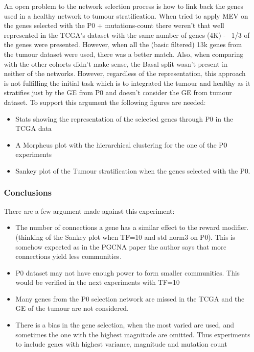 An open problem to the network selection process is how to link back the genes used in a healthy network to tumour stratification. When tried to apply MEV on the genes selected with the P0 + mutations-count there weren't that well represented in the TCGA's dataset with the same number of genes (4K) - ~1/3 of the genes were presented. However, when all the (basic filtered) 13k genes from the tumour dataset were used, there was a better match. Also, when comparing with the other cohorts didn't make sense, the Basal split wasn't present in neither of the networks. However, regardless of the representation, this approach is not fulfilling the initial task which is to integrated the tumour and healthy as it stratifies just by the GE from P0 and doesn't consider the GE from tumour dataset.
To support this argument the following figures are needed:
\begin{itemize}
    \item Stats showing the representation of the selected genes through P0 in the TCGA data
    \item A Morpheus plot with the hierarchical clustering for the one of the P0 experiments
    \item Sankey plot of the Tumour stratification when the genes selected with the P0.
\end{itemize}


\subsubsection{Conclusions}

There are a few argument made against this experiment:
\begin{itemize}
    \item The number of connections a gene has a similar effect to the reward modifier. (thinking of the Sankey plot when TF=10 and std-norm3 on P0). This is somehow expected as in the PGCNA paper the author says that more connections yield less communities.
    \item P0 dataset may not have enough power to form smaller communities. This would be verified in the next experiments with TF=10
    \item Many genes from the P0 selection network are missed in the TCGA and the GE of the tumour are not considered.
    \item There is a bias in the gene selection, when the most varied are used, and sometimes the one with the highest magnitude are omitted. Thus experiments to include genes with highest variance, magnitude and mutation count
\end{itemize}


